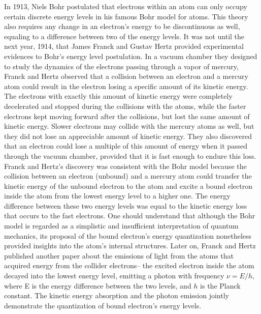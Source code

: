 \documentclass[prb,preprint]{revtex4-1}
\begin{document}
In 1913, Niels Bohr postulated that electrons within an atom can only occupy certain discrete energy levels in his famous Bohr model for atoms. This theory also requires any change in an electron's energy to be discontinuous as well, equaling to a difference between two of the energy levels. It was not until the next year, 1914, that James Franck and Gustav Hertz provided experimental evidences to Bohr's energy level postulation. In a vacuum chamber they designed to study the dynamics of the electrons passing through a vapor of mercury, Franck and Hertz observed that a collision between an electron and a mercury atom could result in the electron losing a specific amount of its kinetic energy. The electrons with exactly this amount of kinetic energy were completely decelerated and stopped during the collisions with the atoms, while the faster electrons kept moving forward after the collisions, but lost the same amount of kinetic energy. Slower electrons may collide with the mercury atoms as well, but they did not lose an appreciable amount of kinetic energy.  They also discovered that an electron could lose a multiple of this amount of energy when it passed through the vacuum chamber, provided that it is fast enough to endure this loss. Franck and Hertz's discovery was consistent with the Bohr model because the collision between an electron (unbound) and a mercury atom could transfer the kinetic energy of the unbound electron to the atom and excite a bound electron inside the atom from the lowest energy level to a higher one. The energy difference between these two energy levels was equal to the kinetic energy loss that occurs to the fast electrons. One should understand that although the Bohr model is regarded as a simplistic and insufficient interpretation of quantum mechanics, its proposal of the bound electron's energy quantization nonetheless provided insights into the atom's internal structures. Later on, Franck and Hertz published another paper about the emissions of light from the atoms that acquired energy from the collider electrons-- the excited electron inside the atom decayed into the lowest energy level, emitting a photon with frequency $\nu=E/h$, where E is the energy difference between the two levels, and $h$ is the Planck constant. The kinetic energy absorption and the photon emission jointly demonstrate the quantization of bound electron's energy levels.
\end{document}
